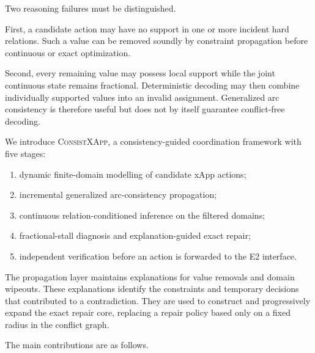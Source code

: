 \documentclass[pdflatex,sn-mathphys-num,iicol,oneside]{sn-jnl}
\newcommand{\method}{\textsc{ConsistXApp}}
\begin{document}
Two reasoning failures must be distinguished.

First, a candidate action may have no support in one or more incident
hard relations. Such a value can be removed soundly by constraint
propagation before continuous or exact optimization.

Second, every remaining value may possess local support while the
joint continuous state remains fractional. Deterministic decoding may
then combine individually supported values into an invalid assignment.
Generalized arc consistency is therefore useful but does not by itself
guarantee conflict-free decoding.

We introduce \method, a consistency-guided coordination framework
with five stages:

\begin{enumerate}
    \item dynamic finite-domain modelling of candidate xApp actions;
    \item incremental generalized arc-consistency propagation;
    \item continuous relation-conditioned inference on the filtered
    domains;
    \item fractional-stall diagnosis and explanation-guided exact
    repair;
    \item independent verification before an action is forwarded to
    the E2 interface.
\end{enumerate}

The propagation layer maintains explanations for value removals and
domain wipeouts. These explanations identify the constraints and
temporary decisions that contributed to a contradiction. They are
used to construct and progressively expand the exact repair core,
replacing a repair policy based only on a fixed radius in the conflict
graph.

The main contributions are as follows.
\end{document}
